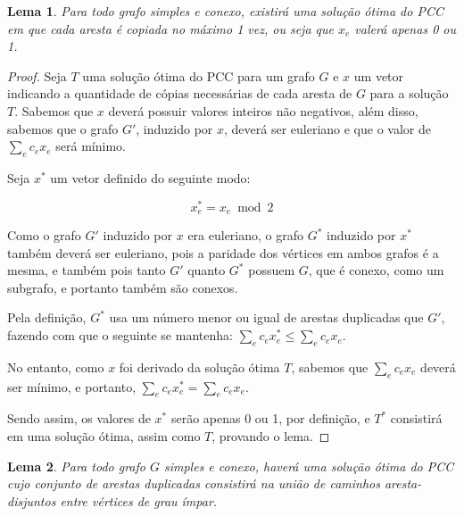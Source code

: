 \documentclass[12pt, a4paper]{article}
\newtheorem{lemma}{Lema}
\begin{document}

\begin{lemma} 
    \label{lemma-pcc}
    Para todo grafo simples e conexo, existirá uma solução ótima do PCC em que cada aresta é copiada no máximo 1 vez, ou seja que $x_e$ valerá apenas 0 ou 1. 
\end{lemma}

\begin{proof}
    Seja $T$ uma solução ótima do PCC para um grafo $G$ e $x$ um vetor indicando a quantidade de cópias necessárias de cada aresta de $G$ para a solução $T$. 
    Sabemos que $x$ deverá possuir valores inteiros não negativos, além disso, sabemos que o grafo $G'$, induzido por $x$, deverá ser euleriano e que o valor de $\sum_e c_ex_e$ será mínimo.

    Seja $x^*$ um vetor definido do seguinte modo:

    \[  x^*_e = x_e \bmod 2    \]

    Como o grafo $G'$ induzido por $x$ era euleriano, o grafo $G^*$ induzido por $x^*$ também deverá ser euleriano, pois a paridade dos vértices em ambos grafos é a mesma, e também pois tanto $G'$ quanto $G^*$ possuem $G$, que é conexo, como um subgrafo, e portanto também são conexos.
    
    Pela definição, $G^*$ usa um número menor ou igual de arestas duplicadas que $G'$, fazendo com que o seguinte se mantenha: $\sum_e c_ex^*_e \leq \sum_e c_ex_e$.

    No entanto, como $x$ foi derivado da solução ótima $T$, sabemos que $\sum_e c_ex_e$ deverá ser mínimo, e portanto, $\sum_e c_ex^*_e = \sum_e c_ex_e$. 

    Sendo assim, os valores de $x^*$ serão apenas 0 ou 1, por definição, e $T^*$ consistirá em uma solução ótima, assim como $T$, provando o lema.

\end{proof}

\begin{lemma}
    Para todo grafo $G$ simples e conexo, haverá uma solução ótima do PCC cujo conjunto de arestas duplicadas consistirá na união de caminhos aresta-disjuntos entre vértices de grau ímpar.
\end{lemma}
\end{document}

